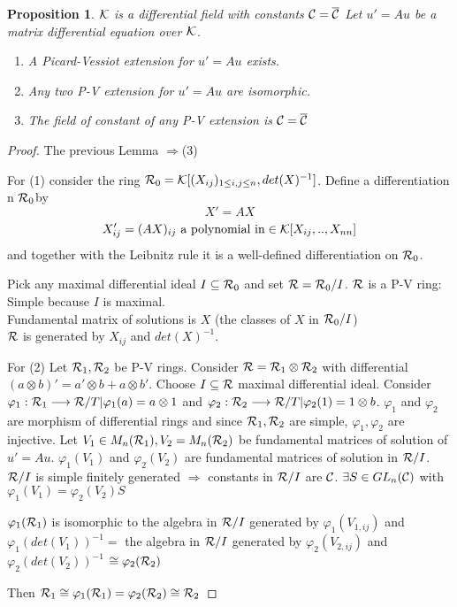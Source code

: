 \documentclass[11pt]{article}
\newtheorem{prop}[thm]{Proposition}
\newcommand{\calc}{{\cal C}}
\newcommand{\calk}{{\cal K}}
\newcommand{\calr}{{\cal R}}
\newcommand{\Lrta}{\Longrightarrow}
\newcommand{\lrta}{\longrightarrow}
\begin{document}
\begin{prop} $\calk$ is a differential field with constants $\calc=\overline{\calc}$
Let $u'=A u$ be a matrix differential equation over $\calk$. 
\begin{enumerate}[label=(\arabic*)]
\item A Picard-Vessiot extension for $u'=A u$ exists. 
\item Any two P-V extension for $u'=Au$ are isomorphic.
\item The field of constant of any P-V extension is $\calc=\overline{\calc}$ 
\end{enumerate}
\end{prop}
\begin{proof}
The previous Lemma $\Lrta $(3)

For (1) consider the ring $\calr_0=\calk[(X_{ij})_{1\leq i,j\leq n},det(X)^{-1}]$. Define a differentiation n $\calr_0$by 
$$
X'=AX
$$
$$
X_{ij}'= (AX)_{ij}\text{ a polynomial in} \in \calk[X_{ij},..,X_{nn}]
$$
and together with the Leibnitz rule it is a well-defined differentiation on $\calr_0$.

Pick any maximal differential ideal $I\subseteq \calr_0$ and set $\calr=\calr_0/I$. $\calr$ is a P-V ring:\\
Simple because $I$ is maximal.\\
Fundamental matrix of solutions is $X$ (the classes of $X$ in $\calr_0/I$)\\
$\calr$ is generated by $X_{ij}$ and $det(X)^{-1}$.

For (2) Let $\calr_1,\calr_2$ be P-V rings. Consider $\calr=\calr_1\otimes \calr_2$ with differential $(a\otimes b)'=a'\otimes b+a\otimes b'$. Choose $I\subseteq \calr$ maximal differential ideal.
Consider $\varphi_1:\calr_1\lrta \calr/T|\varphi_1(a)=a\otimes 1$ and $\varphi_2:\calr_2\lrta \calr/T|\varphi_2(1)=1\otimes b$. $\varphi_1$ and $\varphi_2$ are morphism of differential rings and since $\calr_1,\calr_2$ are simple, $\varphi_1,\varphi_2$ are injective. Let $V_1\in M_n(\calr_1), V_2=M_n(\calr_2)$ be fundamental matrices of solution of $u'=Au$. $\varphi_1(V_1)$ and $\varphi_2(V_2)$ are fundamental matrices of solution in $\calr/I$. $\calr/I$ is simple finitely generated $\Lrta$ constants in $\calr/I$ are $\calc$.
$\exists S\in GL_{n}(\calc)$ with $\varphi_1(V_1)=\varphi_2(V_2) S$

$\varphi_1(\calr_1)$ is isomorphic to the algebra in $\calr/I$ generated by $\varphi_1(V_{1,ij})$ and $\varphi_1(det(V_1))^{-1}=$ the algebra in $\calr/I$ generated by $\varphi_2(V_{2,ij})$ and $\varphi_2(det(V_2))^{-1}$ $\cong \varphi_2(\calr_2)$

Then $\calr_1\cong \varphi_1(\calr_1)=\varphi_2(\calr_2)\cong \calr_2$
\end{proof}
\end{document}
